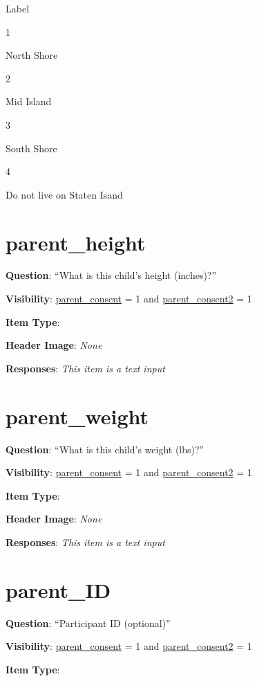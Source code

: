 \documentclass[]{book}
\begin{document}
Label

1

North Shore

2

Mid Island

3

South Shore

4

Do not live on Staten Isand

\hypertarget{parent_height}{%
\section{parent\_height}\label{parent_height}}

\textbf{Question}: ``What is this child's height (inches)?''

\textbf{Visibility}: \protect\hyperlink{parent_consent}{parent\_consent} = 1 and \protect\hyperlink{parent_consent2}{parent\_consent2} = 1

\textbf{Item Type}:

\textbf{Header Image}: \emph{None}

\textbf{Responses}: \emph{This item is a text input}

\hypertarget{parent_weight}{%
\section{parent\_weight}\label{parent_weight}}

\textbf{Question}: ``What is this child's weight (lbs)?''

\textbf{Visibility}: \protect\hyperlink{parent_consent}{parent\_consent} = 1 and \protect\hyperlink{parent_consent2}{parent\_consent2} = 1

\textbf{Item Type}:

\textbf{Header Image}: \emph{None}

\textbf{Responses}: \emph{This item is a text input}

\hypertarget{parent_id}{%
\section{parent\_ID}\label{parent_id}}

\textbf{Question}: ``Participant ID (optional)''

\textbf{Visibility}: \protect\hyperlink{parent_consent}{parent\_consent} = 1 and \protect\hyperlink{parent_consent2}{parent\_consent2} = 1

\textbf{Item Type}:
\end{document}
